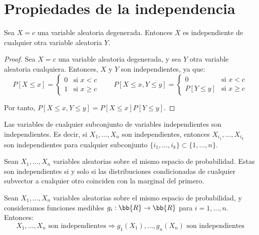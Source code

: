 \section{Propiedades de la independencia}

\begin{prop}
    Sea $X=c$ una variable aleatoria degenerada. Entonces $X$ es independiente de cualquier otra variable aleatoria $Y$.
\end{prop}
\begin{proof}
    Sea $X=c$ una variable aleatoria degenerada, y sea $Y$ otra variable aleatoria cualquiera. Entonces, $X$ y $Y$ son independientes, ya que:
    \begin{equation*}
        P[X\leq x] = \begin{cases}
            0 & \text{si } x< c \\
            1 & \text{si } x\geq c
        \end{cases}
        \qquad
        P[X\leq x, Y\leq y] = \begin{cases}
            0 & \text{si } x< c \\
            P[Y\leq y] & \text{si } x\geq c
        \end{cases}
    \end{equation*}

    Por tanto, $P[X\leq x, Y\leq y] = P[X\leq x]P[Y\leq y]$.
\end{proof}

\begin{prop}
    Las variables de cualquier subconjunto de variables independientes son independientes. Es decir, si $X_1, \ldots, X_n$ son independientes, entonces $X_{i_1}, \ldots, X_{i_k}$ son independientes para cualquier subconjunto $\{i_1, \ldots, i_k\}\subset \{1, \ldots, n\}$.
\end{prop}


\begin{prop}
    Sean $X_1, \ldots, X_n$ variables aleatorias sobre el mismo espacio de probabilidad. Estas son independientes si y solo si las distribuciones condicionadas de cualquier subvector a cualquier otro coinciden con la marginal del primero.
\end{prop}

\begin{prop}
    Sean $X_1, \ldots, X_n$ variables aleatorias sobre el mismo espacio de probabilidad, y consideramos funciones medibles $g_i: \bb{R} \to \bb{R}$ para $i = 1, \ldots, n$. Entonces:
    \begin{equation*}
        X_1, \ldots, X_n \text{ son independientes} \Longrightarrow g_1(X_1), \ldots, g_n(X_n) \text{ son independientes}
    \end{equation*}
\end{prop}

